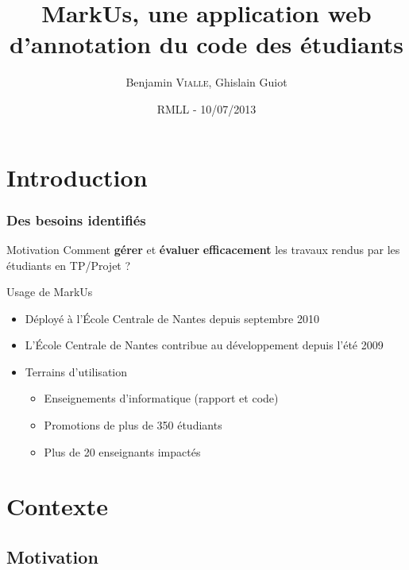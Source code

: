 \documentclass[svgnames,hyperref, french, xcolor=dvipsnames,usenames]{beamer}		        %
\title[MarkUs]%
{MarkUs, une application web d'annotation du code des étudiants}
\author[B. \textsc{Vialle}, G. \textsc{Guiot}]%
{Benjamin \textsc{Vialle}, Ghislain Guiot}
\institute[ECN]{\structure{École Centrale de Nantes}}
\date[10/07/2013]{RMLL - 10/07/2013}
\begin{document}
\frame{\titlepage}


\section{Introduction}

\frame
{
        \frametitle{Des besoins identifiés}

        \begin{alertblock}{Motivation}
                Comment \textbf{gérer} et \textbf{évaluer} \textbf{efficacement} les travaux rendus par les étudiants en TP/Projet ?
        \end{alertblock}

        \begin{block}{Usage de MarkUs}
                \begin{itemize}
                        \item Déployé à l'École Centrale de Nantes depuis septembre 2010
                        \item L'École Centrale de Nantes contribue au développement depuis l'été 2009
                        \item Terrains d'utilisation
                                \begin{itemize}
                                        \item Enseignements d'informatique (rapport et code)
                                        \item Promotions de plus de 350 étudiants
                                        \item Plus de 20 enseignants impactés
                                \end{itemize}
                \end{itemize}
        \end{block}
}

\section{Contexte}

\subsection*{Motivation}
\end{document}
